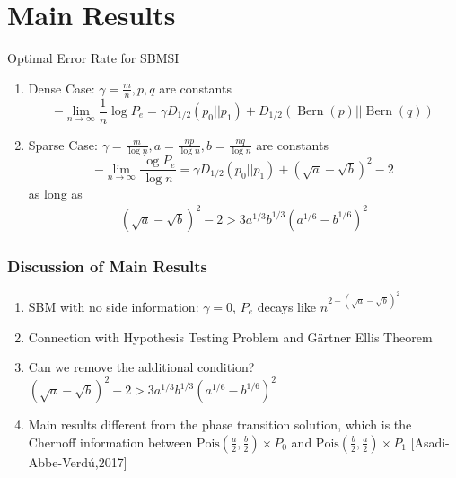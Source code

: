 \documentclass[notheorems]{beamer}
\DeclareMathOperator{\Bern}{Bern}
\begin{document}
\section{Main Results}
\begin{frame}{Optimal Error Rate for SBMSI}
\begin{enumerate}
	\item Dense Case: $\gamma=\frac{m}{n}, p, q$ are constants
		\begin{equation*}
		-\lim_{n\to \infty} \frac{1}{n}\log P_e =  \gamma D_{1/2}(p_0 || p_1) + D_{1/2}(\Bern(p)||\Bern(q))
		\end{equation*}
	\item Sparse Case: $\gamma=\frac{m}{ \log n},
	a=\frac{np}{\log n}, b=\frac{nq}{\log n}$ are constants
		\begin{equation*}\label{eq:PeMainL}
		-\lim_{n\to \infty}\frac{\log P_e}{\log n}=\gamma D_{1/2}(p_0||p_1) + (\sqrt{a} - \sqrt{b})^2-2
		\end{equation*}
		as long as
		\begin{align*}
			(\sqrt{a}-\sqrt{b})^2-2 
			> 3a^{1/3}b^{1/3}(a^{1/6}-b^{1/6})^2\label{eq:oneC}
		\end{align*}	
\end{enumerate}
\end{frame}
\begin{frame}
\frametitle{Discussion of Main Results}
\begin{enumerate}
	\item SBM with no side information: $\gamma = 0$, $P_e$ decays like $n^{2-(\sqrt{a} - \sqrt{b})^2}$
	\item Connection with Hypothesis Testing Problem and Gärtner Ellis Theorem
	\item Can we remove the additional condition?
	$(\sqrt{a}-\sqrt{b})^2-2 
	> 3a^{1/3}b^{1/3}(a^{1/6}-b^{1/6})^2$
	\item Main results different from the phase transition solution,
	which is the Chernoff information
	between $\textrm{Pois}(\frac{a}{2},\frac{b}{2})\times P_0$ and $\textrm{Pois}(\frac{b}{2}, \frac{a}{2})\times P_1$
	[Asadi-Abbe-Verdú,2017]
\end{enumerate}

\end{frame}
\end{document}
